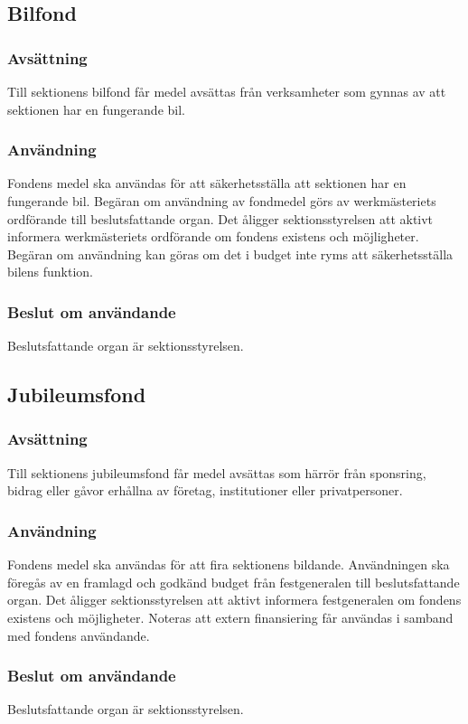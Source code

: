 \documentclass{datateknologsektionen-document}
\begin{document}
\subsection{Bilfond}
\subsubsection{Avsättning}
Till sektionens bilfond får medel avsättas från verksamheter som gynnas av att sektionen har en
fungerande bil.

\subsubsection{Användning}
Fondens medel ska användas för att säkerhetsställa att sektionen har en fungerande bil.
Begäran om användning av fondmedel görs av werkmästeriets ordförande till beslutsfattande
organ. Det åligger sektionsstyrelsen att aktivt informera werkmästeriets ordförande om
fondens existens och möjligheter. Begäran om användning kan göras om det i budget inte
ryms att säkerhetsställa bilens funktion.

\subsubsection{Beslut om användande}
Beslutsfattande organ är sektionsstyrelsen.

\subsection{Jubileumsfond}
\subsubsection{Avsättning}
Till sektionens jubileumsfond får medel avsättas som härrör från sponsring, bidrag
eller gåvor erhållna av företag, institutioner eller privatpersoner.

\subsubsection{Användning}
Fondens medel ska användas för att fira sektionens bildande. Användningen ska föregås
av en framlagd och godkänd budget från festgeneralen till beslutsfattande organ. Det
åligger sektionsstyrelsen att aktivt informera festgeneralen om fondens existens och
möjligheter. Noteras att extern finansiering får användas i samband med fondens användande.

\subsubsection{Beslut om användande}
Beslutsfattande organ är sektionsstyrelsen.
\end{document}
